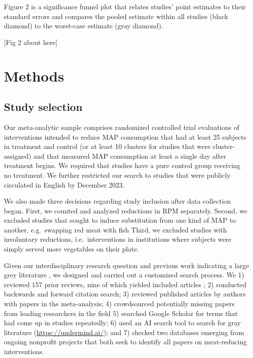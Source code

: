 \documentclass[sn-nature,referee,pdflatex]{sn-jnl}
\begin{document}
Figure 2 is a significance funnel plot \citep{mathur2020} that relates
studies' point estimates to their standard errors and compares the
pooled estimate within all studies (black diamond) to the worst-case
estimate (gray diamond).

\begin{center}
[Fig 2 about here]
\end{center}

\section{Methods}\label{sec3}

\subsection{Study selection}\label{sec3.1}

Our meta-analytic sample comprises randomized controlled trial
evaluations of interventions intended to reduce MAP consumption that had
at least 25 subjects in treatment and control (or at least 10 clusters
for studies that were cluster-assigned) and that measured MAP
consumption at least a single day after treatment begins. We required
that studies have a pure control group receiving no treatment. We
further restricted our search to studies that were publicly circulated
in English by December 2023.

We also made three decisions regarding study inclusion after data
collection began. First, we counted and analyzed reductions in RPM
separately. Second, we excluded studies that sought to induce
substitution from one kind of MAP to another, e.g.~swapping red meat
with fish Third, we excluded studies with involuntary reductions,
i.e.~interventions in institutions where subjects were simply served
more vegetables on their plate.

Given our interdisciplinary research question and previous work
indicating a large grey literature \citep{mathur2021meta}, we designed
and carried out a customized search process. We 1) reviewed 157 prior
reviews, nine of which yielded included articles
\citep{mathur2021meta, bianchi2018conscious, bianchi2018restructuring, ammann2023, chang2023, DiGennaro2024, harguess2020, ronto2022, wynes2018};
2) conducted backwards and forward citation search; 3) reviewed
published articles by authors with papers in the meta-analysis; 4)
crowdsourced potentially missing papers from leading researchers in the
field 5) searched Google Scholar for terms that had come up in studies
repeatedly; 6) used an AI search tool to search for gray literature
(\url{https://undermind.ai/}); and 7) checked two databases emerging
from ongoing nonprofit projects that both seek to identify all papers on
meat-reducing interventions.
\end{document}
